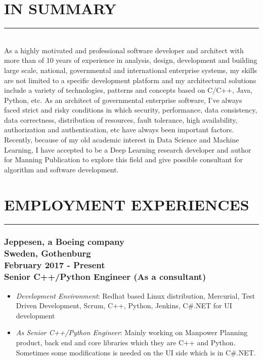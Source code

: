 \documentclass[10pt,a4paper]{article}
\begin{document}
\thispagestyle{fancy}

\section{IN SUMMARY}
\noindent \rule {3.5cm}{0.4pt} \\
As a highly motivated and professional software developer and architect with more than of 10 years of experience in analysis, design, development and building large scale, national, governmental and international enterprise systems, my skills are not limited to a specific development platform and my architectural solutions include a variety of technologies, patterns  and concepts based on C/C++, Java, Python, etc. As an architect of governmental enterprise software, I've always faced strict and risky conditions in which security, performance, data consistency, data correctness, distribution of resources, fault tolerance, high availability, authorization and authentication, etc have always been important factors. Recently, because of my old academic interest in Data Science and Machine Learning, I have accepted to be a Deep Learning research developer and author for Manning Publication to explore this field and give possible consultant for algorithm and software development.

\section{EMPLOYMENT EXPERIENCES}
\noindent \rule {7.3cm}{0.4pt}

\subsubsection{{\large Jeppesen, a Boeing company} \\ \textnormal{Sweden, Gothenburg} \\ \textnormal{February 2017 - Present} \\ {Senior C++/Python Engineer (As a consultant)}}
  \setlength{\leftskip}{0.5cm}
  \setlength{\rightskip}{1cm}
  \begin{itemize}
    \setlength{\rightskip}{1cm}
    \setlength\itemsep{0em}
    \item \small \textit {Development Environment}: Redhat based Linux distribution, Mercurial, Test Driven Development, Scrum, C++, Python, Jenkins, C\#.NET for UI development
    \item \small \textit {As Senior C++/Python Engineer}: Mainly working on Manpower Planning product, back end and core libraries which they are C++ and Python. Sometimes some modifications is needed on the UI side which is in C\#.NET.
  \end{itemize}
  \setlength{\leftskip}{0pt}
  \setlength{\rightskip}{0cm}
  
\end{document}
